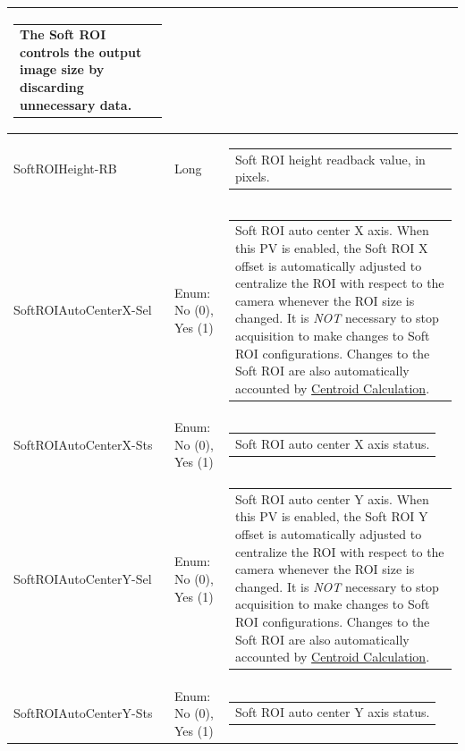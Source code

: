 \documentclass[openany]{article}
\begin{document}
\begin{longtable}{| m{3.0cm} m{4.5cm}  m{7.0cm} |}
\begin{tabular}{@{}m{6cm}@{}}
                The Soft ROI controls the output image size by discarding unnecessary data.
            \end{tabular} \\ \hline
        SoftROIHeight-RB & Long & \begin{tabular}{@{}m{6cm}@{}}
                Soft ROI height readback value, in pixels.
            \end{tabular} \hypertarget{pv:soft-roi-auto-center-x}{}\\ \hline
        SoftROIAutoCenterX-Sel & Enum: No (0), Yes (1) & \begin{tabular}{@{}m{6cm}@{}}
                Soft ROI auto center X axis. When this PV is enabled, the Soft ROI X offset 
                is automatically adjusted to centralize the ROI with respect to the camera
                whenever the ROI size is changed. It is \emph{NOT} necessary to stop
                acquisition to make changes to Soft ROI configurations. Changes to the
                Soft ROI are also automatically accounted by 
                \hyperref[sec:centroid-calc]{Centroid Calculation}.
            \end{tabular} \\ \hline
        SoftROIAutoCenterX-Sts & Enum: No (0), Yes (1) & \begin{tabular}{@{}m{6cm}@{}}
                Soft ROI auto center X axis status.
            \end{tabular} \hypertarget{pv:soft-roi-auto-center-y}{}\\ \hline
        SoftROIAutoCenterY-Sel & Enum: No (0), Yes (1) & \begin{tabular}{@{}m{6cm}@{}}
                Soft ROI auto center Y axis. When this PV is enabled, the Soft ROI Y offset 
                is automatically adjusted to centralize the ROI with respect to the camera
                whenever the ROI size is changed. It is \emph{NOT} necessary to stop
                acquisition to make changes to Soft ROI configurations. Changes to the
                Soft ROI are also automatically accounted by 
                \hyperref[sec:centroid-calc]{Centroid Calculation}.
            \end{tabular} \\ \hline
        SoftROIAutoCenterY-Sts & Enum: No (0), Yes (1) & \begin{tabular}{@{}m{6cm}@{}}
                Soft ROI auto center Y axis status.

\end{tabular}
\end{longtable}
\end{document}
